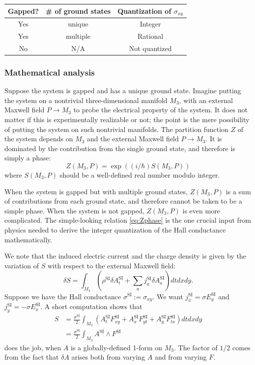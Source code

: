 \documentclass[12pt]{article}
\numberwithin{equation}{section}
\numberwithin{figure}{section}
\theoremstyle{remark}
\renewenvironment{table}[1][]{
  \begin{originaltable}[#1]
    \begin{mdframed}[linecolor=black!0,backgroundcolor=black!1]
}{
    \end{mdframed}
  \end{originaltable}
}
\begin{document}
\begin{table}
  \centering
\begin{tabular}{c|c||c}
Gapped?  & \# of ground states & Quantization of $\sigma_{xy}$\\
\hline
Yes& unique  & Integer\\
Yes& multiple  & Rational\\
No & N/A & Not quantized
\end{tabular}
\caption{Quantization of the Hall conductance in various situations.
\label{tab:Hall}}
\end{table}

\subsubsection{Mathematical analysis}

Suppose the system is gapped and has a unique ground state.
Imagine putting the system on a nontrivial three-dimensional manifold $M_3$,
with an external Maxwell field $P\to M_3$ 
to probe the electrical property of the system.
It does not matter if this is experimentally realizable or not;
the point is the mere possibility of putting the system on such nontrivial manifolds.
The partition function $Z$ of the system 
depends on $M_3$ and the external Maxwell field $P\to M_3$.
It is dominated by the contribution from the single ground state,
and therefore is simply a phase: \begin{equation}
Z(M_3,P) = \exp( (i/\hbar) S(M_3,P))\label{eq:Zphase}
\end{equation}
where $S(M_3,P)$ should be a well-defined real number modulo integer.


When the system is gapped but with multiple ground states,
$Z(M_3,P)$ is a sum of contributions from each ground state,
and therefore cannot be taken to be a simple phase.
When the system is not gapped, $Z(M_3,P)$ is even more complicated.
The simple-looking relation \eqref{eq:Zphase} 
is the one crucial input from physics
needed to derive the integer quantization of the Hall conductance
mathematically.

We note that the induced electric current and the charge density
is given by the variation of $S$ with respect to the external Maxwell field:
\begin{equation}
  \delta S=\int_{M_3} (\rho^\text{SI} \delta A^\text{SI}_t 
  + \sum_a j^\text{SI}_a \delta A^\text{SI}_a) dt dx dy.
\end{equation}
Suppose we have the Hall conductance $\sigma^\text{SI}:=\sigma_{xy}$.
We want $j^\text{SI}_x=\sigma E_y^\text{SI}$ and $j^\text{SI}_y=-\sigma E_x^\text{SI}$.
A short computation shows that \begin{align}
S&=\frac{\sigma^\text{SI}}2 \int_{M_3} 
(A^\text{SI}_t F_{xy}^\text{SI} + A^\text{SI}_x F_{yt}^\text{SI} + A^\text{SI}_y F_{tx}^\text{SI}) dt dx dy \\
&= \frac{\sigma^\text{SI}}2 \int_{M_3} A^\text{SI}\wedge F^\text{SI}
\label{eq:halldef}
\end{align} does the job,
when $A$ is a globally-defined 1-form on $M_3$.
The factor of $1/2$ comes from the fact that $\delta A$ arises
both from varying $A$ and from varying $F$.
\end{document}

